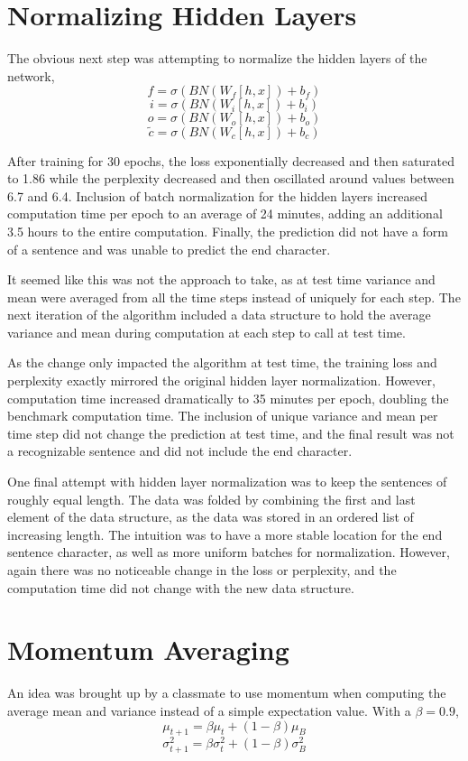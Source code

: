 \documentclass[]{article}
\begin{document}
\section*{Normalizing Hidden Layers}
The obvious next step was attempting to normalize the hidden layers of the network,
\[
f = \sigma(BN(W_f[h,x])+b_f)
\]
\[
i = \sigma(BN(W_i[h,x])+b_i)
\] 
\[
o = \sigma(BN(W_o[h,x])+b_o)
\] 
\[
\tilde{c} = \sigma(BN(W_c[h,x])+b_c)
\]

After training for 30 epochs, the loss exponentially decreased and then saturated to 1.86 while the perplexity decreased and then oscillated around values between 6.7 and 6.4. Inclusion of batch normalization for the hidden layers increased computation time per epoch to an average of 24 minutes, adding an additional 3.5 hours to the entire computation. Finally, the prediction did not have a form of a sentence and was unable to predict the end character.   

It seemed like this was not the approach to take, as at test time variance and mean were averaged from all the time steps instead of uniquely for each step. The next iteration of the algorithm included a data structure to hold the average variance and mean during computation at each step to call at test time. 

As the change only impacted the algorithm at test time, the training loss and perplexity exactly mirrored the original hidden layer normalization. However, computation time increased dramatically to 35 minutes per epoch, doubling the benchmark computation time. The inclusion of unique variance and mean per time step did not change the prediction at test time, and the final result was not a recognizable sentence and did not include the end character. 

One final attempt with hidden layer normalization was to keep the sentences of roughly equal length. The data was folded by combining the first and last element of the data structure, as the data was stored in an ordered list of increasing length. The intuition was to have a more stable location for the end sentence character, as well as more uniform batches for normalization. However, again there was no noticeable change in the loss or perplexity, and the computation time did not change with the new data structure. 

\section*{Momentum Averaging}
An idea was brought up by a classmate to use momentum when computing the average mean and variance instead of a simple expectation value. With a $\beta = 0.9$,
\[
\mu_{t+1} = \beta\mu_t+(1-\beta)\mu_B 
\]
\[
\sigma^2_{t+1} = \beta\sigma^2_t+(1-\beta)\sigma^2_B 
\]
\end{document}
